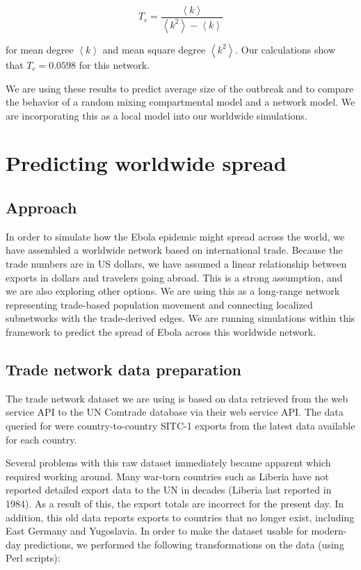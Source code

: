 \documentclass[10pt, journal,onecolumn]{IEEEtran}
\begin{document}
\[
T_c =\dfrac{\left\langle k \right\rangle}{\left\langle k^2 \right\rangle - \left\langle k \right\rangle}
\]

for mean degree $\left\langle k \right\rangle$ and mean square degree
$\left\langle k^2 \right\rangle$. Our calculations show that $T_c=0.0598$ for this network.

We are using these results to predict average size of the outbreak and to compare the behavior of
a random mixing compartmental model and a network model.
We are incorporating this as a local model into our worldwide simulations.






\section{Predicting worldwide spread}
\label{sec:Worldwide}

\subsection*{\textbf{Approach}}
In order to simulate how the Ebola epidemic might spread across the world, we have assembled a
worldwide network based on international trade. Because the trade numbers are in US dollars,
we have assumed a linear relationship between exports in dollars and travelers going abroad.
This is a strong assumption, and we are also exploring other options.
We are using this as a long-range network representing trade-based population movement and
connecting localized subnetworks with the trade-derived edges. We are running simulations
within this framework to predict the spread of Ebola across this worldwide network.

\subsection*{\textbf{Trade network data preparation}}

The trade network dataset we are using is based on data retrieved from the web service API to the
UN Comtrade database \citep{uncomtradedata} via their web service API.
The data queried for were country-to-country SITC-1 exports from the latest data available
for each country.

Several problems with this raw dataset immediately became apparent which required working around.
Many war-torn countries such as Liberia have not reported detailed export data
to the UN in decades (Liberia last reported in 1984). As a result of this, the export totals
are incorrect for the present day. In addition, this old data reports exports to countries that
no longer exist, including East Germany and Yugoslavia. In order to make the dataset usable for
modern-day predictions, we performed the following transformations on the data (using Perl scripts):
\end{document}
